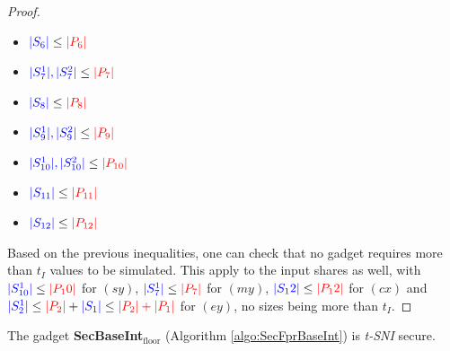 \documentclass[runningheads]{llncs}
\begin{document}
\begin{proof}
\begin{multicols}{2}
\begin{itemize}
      \item $\textcolor{blue}{|S_6|} \leq \textcolor{red}{|P_6|}$
      \item $\textcolor{blue}{|S_7^1|,|S_7^2|} \leq \textcolor{red}{|P_7|}$
      \item $\textcolor{blue}{|S_8|} \leq \textcolor{red}{|P_8|}$
      \item $\textcolor{blue}{|S_9^1|,|S_9^2|} \leq \textcolor{red}{|P_9|}$
      \item $\textcolor{blue}{|S_{10}^1|,|S_{10}^2|} \leq \textcolor{red}{|P_{10}|}$
      \item $\textcolor{blue}{|S_{11}|} \leq \textcolor{red}{|P_{11}|}$
      \item $\textcolor{blue}{|S_{12}|} \leq \textcolor{red}{|P_{12}|}$
    \end{itemize}
  \end{multicols}
  Based on the previous inequalities, one can check that no gadget requires more than $t_I$ values to be simulated. This apply to the input shares as well, with $\textcolor{blue}{|S_{10}^1|}\leq\textcolor{red}{|P_10|}$ for $(sy)$, $\textcolor{blue}{|S_7^1|}\leq\textcolor{red}{|P_7|}$ for $(my)$, $\textcolor{blue}{|S_12|} \leq \textcolor{red}{|P_12|}$ for $(cx)$ and $\textcolor{blue}{|S_2^1|}\leq\textcolor{red}{|P_2|} + \textcolor{blue}{|S_1|} \leq \textcolor{red}{|P_2| + |P_1|}$ for $(ey)$, no sizes being more than $t_I$.
\end{proof}

\begin{theorem}
  The gadget \textbf{SecBaseInt$_\text{floor}$} (Algorithm \ref{algo:SecFprBaseInt}) is \emph{t-SNI} secure.
\end{theorem}
\end{document}
